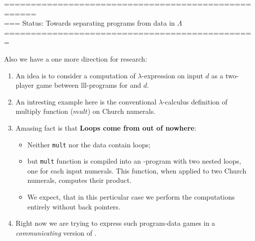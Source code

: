 \documentclass[a4paper, 10pt]{article} %
\newcommand{\bi}{\begin{itemize}}
\newcommand{\ei}{\end{itemize}}
\newcommand{\be}{\begin{enumerate}}
\newcommand{\ee}{\end{enumerate}}
\newcommand{\ii}{\item}
\newcommand{\red}[1]{{\color{red}#1}}
\newcommand{\green}[1]{{\color{blue!20!black!30!green}#1}}
\newcommand{\blue}[1]{{\color{blue}#1}}
\newcommand{\lam}[1]{{\color{brown}\emph{\boldmath{#1}}}}
\begin{document}
====================================================\\
=== Status: Towards separating programs from data in $\Lambda$
===============================================

Also we have a one more direction for research:
\be
\ii An idea is to consider a \green{computation of $\lambda$-expression \lam{$M$} on input $d$} as a
  \red{ \blue{two-player game} between {\sc lll}-programs for \lam{$M$} and $d$}.
\ii An intresting example here is the conventional $\lambda$-calculus definition of multiply function ($mult$)
  on Church numerals.
\ii Amasing fact is that \textbf{Loops come from out of nowhere}:
  \bi
  \ii \green{Neither {\tt mult} nor the data contain loops};
  \ii but  {\tt mult} function is compiled into \blue{an {\lam{LLL}}-program with two nested loops}, one for 
      each input numerals. This function,  when applied to two Church numerals, computes their product.
  \ii We expect, that in this perticular case we perform the computations \green{entirely without back pointers}.
  \ei
\ii Right now we are trying to express such program-data games in a \red{\em communicating} version of \lam{LLL}. 
\ee
\end{document}
